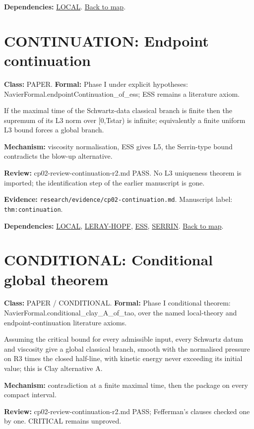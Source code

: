 \documentclass[10pt]{article}
\begin{document}
\textbf{Dependencies:} \hyperref[node:LOCAL]{LOCAL}. \hyperref[map]{Back to map}.

\section*{CONTINUATION: Endpoint continuation}\label{node:CONTINUATION}
\textbf{Class:} PAPER. \textbf{Formal:} Phase I under explicit hypotheses: NavierFormal.endpointContinuation\_of\_ess; ESS remains a literature axiom.

If the maximal time of the Schwartz-data classical branch is finite then the supremum of its L3 norm over [0,Tstar) is infinite; equivalently a finite uniform L3 bound forces a global branch.

\textbf{Mechanism:} viscosity normalisation, ESS gives L5, the Serrin-type bound contradicts the blow-up alternative.

\textbf{Review:} cp02-review-continuation-r2.md PASS. No L3 uniqueness theorem is imported; the identification step of the earlier manuscript is gone.

\textbf{Evidence:} \texttt{research/evidence/cp02-continuation.md}. Manuscript label: \texttt{thm:continuation}.

\textbf{Dependencies:} \hyperref[node:LOCAL]{LOCAL}, \hyperref[node:LERAY-HOPF]{LERAY-HOPF}, \hyperref[node:ESS]{ESS}, \hyperref[node:SERRIN]{SERRIN}. \hyperref[map]{Back to map}.

\section*{CONDITIONAL: Conditional global theorem}\label{node:CONDITIONAL}
\textbf{Class:} PAPER / CONDITIONAL. \textbf{Formal:} Phase I conditional theorem: NavierFormal.conditional\_clay\_A\_of\_tao, over the named local-theory and endpoint-continuation literature axioms.

Assuming the critical bound for every admissible input, every Schwartz datum and viscosity give a global classical branch, smooth with the normalised pressure on R3 times the closed half-line, with kinetic energy never exceeding its initial value; this is Clay alternative A.

\textbf{Mechanism:} contradiction at a finite maximal time, then the package on every compact interval.

\textbf{Review:} cp02-review-continuation-r2.md PASS; Fefferman's clauses checked one by one. CRITICAL remains unproved.
\end{document}
